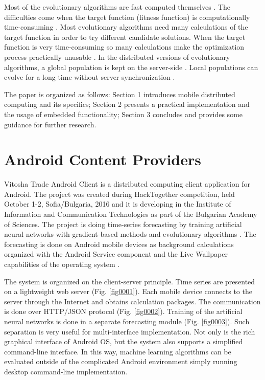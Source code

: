 \documentclass{ifacconf}
\begin{document}
Most of the evolutionary algorithms are fast computed themselves \cite{Vural-2012-a}. The difficulties come when the target function (fitness function) is computationally time-consuming \cite{Di-Pietro-2004-a}. Most evolutionary algorithms need many calculations of the target function \cite{Shi-2010-a} in order to try different candidate solutions. When the target function is very time-consuming so many calculations make the optimization process practically unusable \cite{Lee-2015-a}. In the distributed versions of evolutionary algorithms, a global population is kept on the server-side \cite{Gong-2015-a}. Local populations can evolve for a long time without server synchronization \cite{Balabanov-2016-a}. 

The paper is organized as follows: Section 1 introduces mobile distributed computing and its specifics; Section 2 presents a practical implementation and the usage of embedded functionality; Section 3 concludes and provides some guidance for further research. 

\section{Android Content Providers}

Vitosha Trade Android Client \cite{Balabanov-2022-a} is a distributed computing client application for Android. The project was created during HackTogether competition, held October 1-2, Sofia/Bulgaria, 2016 and it is developing in the Institute of Information and Communication Technologies as part of the Bulgarian Academy of Sciences. The project is doing time-series forecasting by training artificial neural networks with gradient-based methods \cite{Tomov-2021-a} and evolutionary algorithms \cite{Tomov-2021-b}. The forecasting is done on Android mobile devices as background calculations organized with the Android Service component and the Live Wallpaper capabilities of the operating system \cite{Mateeva-2021-a}. 

The system is organized on the client-server principle. Time series are presented on a lightweight web server (Fig. \ref{fig0001}). Each mobile device connects to the server through the Internet and obtains calculation packages. The communication is done over HTTP/JSON protocol (Fig. \ref{fig0002}). Training of the artificial neural networks is done in a separate forecasting module (Fig. \ref{fig0003}). Such separation is very useful for multi-interface implementation. Not only is the rich graphical interface of Android OS, but the system also supports a simplified command-line interface. In this way, machine learning algorithms can be evaluated outside of the complicated Android environment simply running desktop command-line implementation. 
\end{document}
